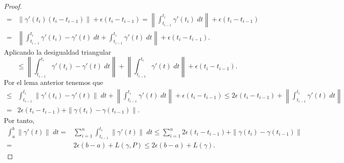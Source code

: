 \begin{proof}
\[
\begin{split}
	= &\|\gamma'\left(t_{i}\right)\left(t_{i}-t_{i-1}\right)\| + \epsilon \left(t_{i}-t_{i-1}\right)=\left\|\int^{t_{i}}_{t_{i-1}} \gamma'\left(t_{i}\right) \; dt\right\| +\epsilon \left(t_{i}-t_{i-1}\right)\\
= & \left\|\int^{t_{i}}_{t_{i-1}} \gamma'\left(t_{i}\right)-\gamma'\left(t\right) \; dt+\int^{t_{i}}_{t_{i-1}} \gamma'\left(t\right) \; dt\right\| +\epsilon \left(t_{i}-t_{i-1}\right).
\end{split}
\]
Aplicando la desigualdad triangular
\[\leq \left\|\int^{t_{i}}_{t_{i-1}} \gamma'\left(t_{i}\right)-\gamma'\left(t\right) \; dt\right\| +\left\|\int^{t_{i}}_{t_{i-1}} \gamma'\left(t\right) \; dt\right\| + \epsilon \left(t_{i}-t_{i-1}\right).\]
Por el lema anterior tenemos que 
\[
\begin{split}
	\leq & \int^{t_{i}}_{t_{i-1}} \|\gamma'\left(t_{i}\right)-\gamma'\left(t\right)\| \; dt +\left\|\int^{t_{i}}_{t_{i-1}} \gamma'\left(t\right) \; dt\right\| + \epsilon \left(t_{i}-t_{i-1}\right) \leq 2\epsilon \left(t_{i}-t_{i-1}\right)+\left\|\int^{t_{i}}_{t_{i-1}} \gamma'\left(t\right) \; dt\right\|\\
	= & 2\epsilon \left(t_{i}-t_{i-1}\right)+\|\gamma\left(t_{i}\right)-\gamma\left(t_{i-1}\right)\|.
\end{split}
\]
Por tanto,
\[
\begin{split}
	\int^{b}_{a} \|\gamma'\left(t\right)\| \; dt = & \sum^{n}_{i = 1}\int^{t_{i}}_{t_{i-1}} \|\gamma'\left(t\right)\| \; dt\leq \sum^{n}_{i = 1}2\epsilon \left(t_{i}-t_{i-1}\right)+\|\gamma\left(t_{i}\right)-\gamma\left(t_{i-1}\right)\|\\
	= & 2\epsilon \left(b-a\right)+L\left(\gamma, P\right)\leq 2\epsilon\left(b-a\right)+L\left(\gamma \right).
\end{split}
\]
\end{proof}

